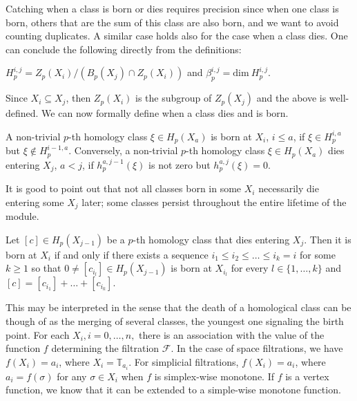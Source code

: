 Catching when a class is born or dies requires precision since when one class is born, others that are the sum of this class are also born, and we want to avoid counting duplicates. A similar case holds also for the case when a class dies. One can conclude the following directly from the definitions:

\begin{lemma}
  $H^{i,j}_{p} = Z_{p}(X_{i}) / (B_{p}(X_{j}) \cap Z_{p}(X_{i}))$ and $\beta^{i,j}_{p} = \text{dim}\:H^{i,j}_{p}$.
\end{lemma}
Since $X_{i} \subseteq X_{j}$, then $Z_{p}(X_{i})$ is the subgroup of $Z_{p}(X_{j})$ and the above is well-defined. We can now formally define when a class dies and is born.

\begin{definition}
  A non-trivial $p$-th homology class $\xi \in H_{p}(X_{a})$ is born at $X_{i}$, $i \leq a$, if $\xi \in H^{i, a}_{p}$ but $\xi \notin H^{i-1, a}_{p}$. Conversely, a non-trivial $p$-th homology class $\xi \in H_{p}(X_{a})$ dies entering $X_{j}$, $a < j$, if $h^{a, j-1}_{p}(\xi)$ is not zero but $h^{a, j}_{p}(\xi) = 0$.
\end{definition}

It is good to point out that not all classes born in some $X_{i}$ necessarily die entering some $X_{j}$ later; some classes persist throughout the entire lifetime of the module.

\begin{theorem}
  Let $[c] \in H_{p}(X_{j-1})$ be a $p$-th homology class that dies entering $X_{j}$. Then it is born at $X_{i}$ if and only if there exists a sequence $i_{1} \leq i_{2} \leq \ldots \leq i_{k} = i$ for some $k \geq 1$ so that $0 \neq [c_{i_{l}}] \in H_{p}(X_{j-1})$ is born at $X_{i_{l}}$ for every $l \in \{1, \ldots, k\}$ and $[c] = [c_{i_{1}}] + \ldots + [c_{i_{k}}].$
\end{theorem}

This may be interpreted in the sense that the death of a homological class can be though of as the merging of several classes, the youngest one signaling the birth point. For each $X_{i}, i = 0, \ldots, n,$ there is an association with the value of the function $f$ determining the filtration $\mathcal{F}$. In the case of space filtrations, we have $f(X_{i}) = a_{i}$, where $X_{i} = \mathbb{T}_{a_{i}}$. For simplicial filtrations, $f(X_{i}) = a_{i}$, where $a_{i} = f(\sigma)$ for any $\sigma \in X_{i}$ when $f$ is simplex-wise monotone. If $f$ is a vertex function, we know that it can be extended to a simple-wise monotone function.

